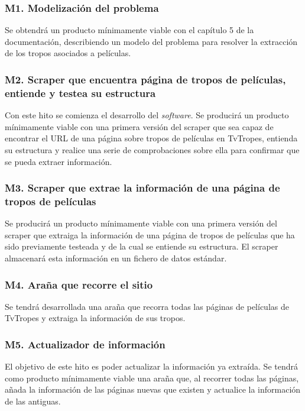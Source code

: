 \subsubsection{M1. Modelización del problema}
Se obtendrá un producto mínimamente viable con el capítulo 5 de la
documentación, describiendo un modelo del problema para resolver la extracción
de los tropos asociados a películas.


\subsubsection{M2. Scraper que encuentra página de tropos de películas, entiende y testea su estructura}
Con este hito se comienza el desarrollo del \textit{software}. Se producirá un
producto mínimamente viable con una primera versión del scraper que sea capaz de
encontrar el URL de una página sobre tropos de películas en TvTropes, entienda
su estructura y realice una serie de comprobaciones sobre ella para confirmar
que se pueda extraer información.

\subsubsection{M3. Scraper que extrae la información de una página de tropos de películas}
Se producirá un producto mínimamente viable con una primera versión del scraper
que extraiga la información de una página de tropos de películas que ha sido
previamente testeada y de la cual se entiende su estructura. El scraper
almacenará esta información en un fichero de datos estándar.


\subsubsection{M4. Araña que recorre el sitio}
Se tendrá desarrollada una araña que recorra todas las páginas de películas de
TvTropes y extraiga la información de sus tropos.

\subsubsection{M5. Actualizador de información}
El objetivo de este hito es poder actualizar la información ya extraída. Se
tendrá como producto mínimamente viable una araña que, al recorrer todas las
páginas, añada la información de las páginas nuevas que existen y actualice la
información de las antiguas.

